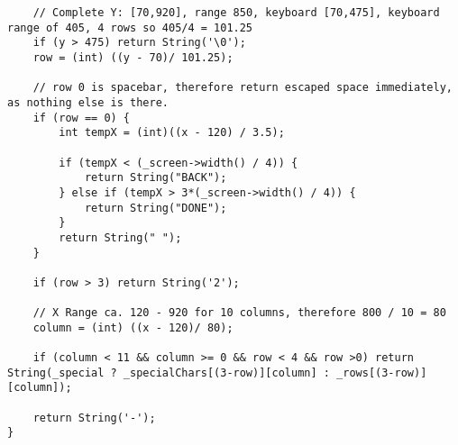 \documentclass[a4paper, 11pt]{scrartcl}
\begin{document}
\begin{lstlisting}
    // Complete Y: [70,920], range 850, keyboard [70,475], keyboard range of 405, 4 rows so 405/4 = 101.25
    if (y > 475) return String('\0');
    row = (int) ((y - 70)/ 101.25);

    // row 0 is spacebar, therefore return escaped space immediately, as nothing else is there.
    if (row == 0) {
        int tempX = (int)((x - 120) / 3.5);

        if (tempX < (_screen->width() / 4)) {
            return String("BACK");
        } else if (tempX > 3*(_screen->width() / 4)) {
            return String("DONE");
        }
        return String(" ");
    }

    if (row > 3) return String('2');

    // X Range ca. 120 - 920 for 10 columns, therefore 800 / 10 = 80
    column = (int) ((x - 120)/ 80);

    if (column < 11 && column >= 0 && row < 4 && row >0) return String(_special ? _specialChars[(3-row)][column] : _rows[(3-row)][column]);
    
    return String('-');
}
\end{lstlisting}
\end{document}
